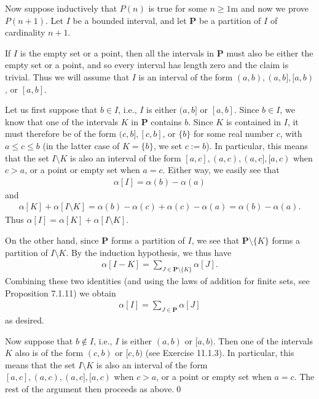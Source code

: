 \documentclass{book}
\newcounter{Exercise}[section]
\begin{document}
Now suppose inductively that $P(n)$ is true for some $n \geq 1$m and now we prove $P(n + 1)$. Let $I$ be a bounded interval, and let $\mathbf{P}$ be a partition of $I$ of cardinality $n + 1$.

If $I$ is the empty set or a point, then all the intervals in $\mathbf{P}$ must also be either the empty set or a point, and so every interval has length zero and the claim is trivial. Thus we will assume that $I$ is an interval of the form $(a, b), (a, b], [a, b)$, or $[a, b]$.

Let us first suppose that $b \in I$, i.e., $I$ is either $(a, b]$ or $[a, b]$. Since $b \in I$, we know that one of the intervals $K$ in $\mathbf{P}$ contains $b$. Since $K$ is contained in $I$, it must therefore be of the form $(c, b], [c, b]$, or $\{b\}$ for some real number $c$, with $a \leq c \leq b$ (in the latter case of $K = \{b\}$, we set $c := b$). In particular, this means that the set $I \setminus K$ is also an interval of the form $[a, c], (a, c), (a, c], [a, c)$ when $c > a$, or a point or empty set when $a = c$. Either way, we easily see that
    \begin{align*}
        \alpha[I] = \alpha(b) - \alpha(a)
    \end{align*}
and
    \begin{align*}
        \alpha[K] + \alpha[I \setminus K] = \alpha(b) - \alpha(c) + \alpha(c) - \alpha(a) = \alpha(b) - \alpha(a).
    \end{align*}
Thus $\alpha[I] = \alpha[K] + \alpha[I \setminus K]$.

On the other hand, since $\mathbf{P}$ forms a partition of $I$, we see that $\mathbf{P} \setminus \{K\}$ forms a partition of $I \setminus K$. By the induction hypothesis, we thus have
    \begin{align*}
        \alpha[I - K] = \sum_{J \in \mathbf{P}\setminus \{K\}} \alpha[J].
    \end{align*}
Combining these two identities (and using the laws of addition for finite sets, see Proposition 7.1.11) we obtain
    \begin{align*}
        \alpha[I] = \sum_{J \in \mathbf{P}} \alpha[J]
    \end{align*}
as desired.

Now suppose that $b \notin I$, i.e., $I$ is either $(a, b)$ or $[a, b)$. Then one of the intervals $K$ also is of the form $(c, b)$ or $[c, b)$ (see Exercise 11.1.3). In particular, this means that the set $I \setminus K$ is also an interval of the form $[a, c], (a, c), (a, c], [a, c)$ when $c > a$, or a point or empty set when $a = c$. The rest of the argument then proceeds as above.\qed
\end{document}

